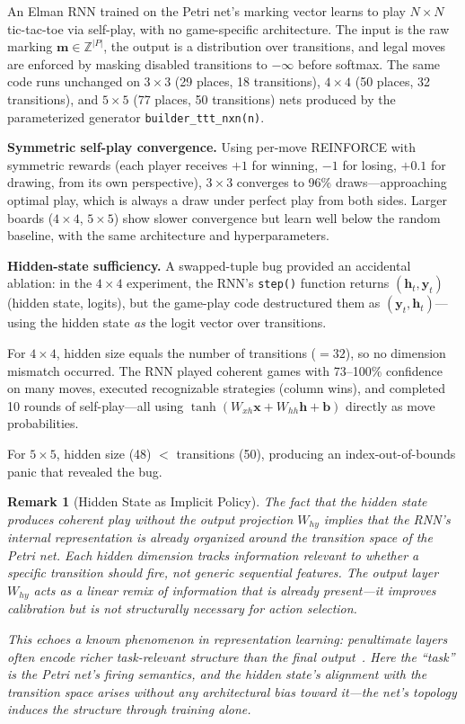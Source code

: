 \documentclass[11pt,a4paper]{article}
\newtheorem{remark}[theorem]{Remark}
\begin{document}
An Elman RNN trained on the Petri net's marking vector learns to play
$N{\times}N$ tic-tac-toe via self-play, with no game-specific architecture.
The input is the raw marking $\mathbf{m} \in \mathbb{Z}^{|P|}$, the output is
a distribution over transitions, and legal moves are enforced by masking
disabled transitions to $-\infty$ before softmax.
The same code runs unchanged on $3{\times}3$ (29 places, 18 transitions),
$4{\times}4$ (50 places, 32 transitions), and $5{\times}5$ (77 places, 50 transitions)
nets produced by the parameterized generator \texttt{builder\_ttt\_nxn(n)}.

\medskip
\noindent\textbf{Symmetric self-play convergence.}\quad
Using per-move REINFORCE with symmetric rewards (each player receives
$+1$ for winning, $-1$ for losing, $+0.1$ for drawing, from its own
perspective), $3{\times}3$ converges to 96\% draws---approaching optimal play,
which is always a draw under perfect play from both sides.
Larger boards ($4{\times}4$, $5{\times}5$) show slower convergence but learn
well below the random baseline, with the same architecture and
hyperparameters.

\medskip
\noindent\textbf{Hidden-state sufficiency.}\quad
A swapped-tuple bug provided an accidental ablation: in the $4{\times}4$
experiment, the RNN's \texttt{step()} function returns
$(\mathbf{h}_t, \mathbf{y}_t)$ (hidden state, logits), but the game-play
code destructured them as $(\mathbf{y}_t, \mathbf{h}_t)$---using the hidden
state \emph{as} the logit vector over transitions.

For $4{\times}4$, hidden size equals the number of transitions ($= 32$),
so no dimension mismatch occurred.  The RNN played coherent games with
73--100\% confidence on many moves, executed recognizable strategies
(column wins), and completed 10 rounds of self-play---all using
$\tanh(W_{xh}\mathbf{x} + W_{hh}\mathbf{h} + \mathbf{b})$
directly as move probabilities.

For $5{\times}5$, hidden size (48) $<$ transitions (50), producing an
index-out-of-bounds panic that revealed the bug.

\begin{remark}[Hidden State as Implicit Policy]
\label{rem:hidden-policy}
The fact that the hidden state produces coherent play without the
output projection $W_{hy}$ implies that the RNN's internal
representation is already organized around the transition space of the
Petri net.  Each hidden dimension tracks information relevant to
\emph{whether a specific transition should fire}, not generic
sequential features.  The output layer $W_{hy}$ acts as a linear
remix of information that is already present---it improves calibration
but is not structurally necessary for action selection.

This echoes a known phenomenon in representation learning: penultimate
layers often encode richer task-relevant structure than the final
output~\cite{bengio2013}.  Here the ``task'' is the Petri net's
firing semantics, and the hidden state's alignment with the transition
space arises without any architectural bias toward it---the net's
topology induces the structure through training alone.
\end{remark}
\end{document}
